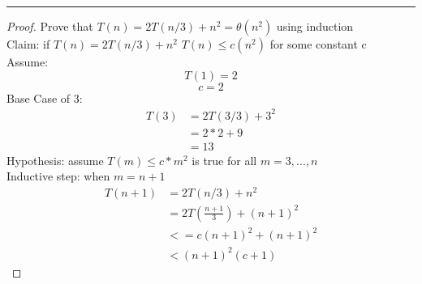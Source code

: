 \documentclass[11pt]{article}
\begin{document}
	\renewcommand{\headrulewidth}{0.4pt}
	
	
	
	\noindent
	\rule[0.1cm]{16.5cm}{0.01cm} 
	
	\vspace*{2mm}
	
	

	
	
	\bigskip
	\bigskip
	\begin{proof} Prove that $T(n) = 2T(n/3) +n^2 = \theta(n^2)$ using induction\\
	 	Claim: if $T(n) = 2T(n/3) +n^2$ $T(n) \leq c(n^2)$ for some constant c\\
	 	Assume:	\\
	 	$$T(1) = 2$$
	 	$$c = 2$$
		Base Case of 3:	
		 	\begin{align*}
		 		T(3) &= 2T(3/3) + 3^2\\
		 		&=2 * 2 + 9\\
		 		&= 13
		 	\end{align*}
		Hypothesis: assume $T(m) \leq c*m^2$ is true for all $m = 3,...,n$\\
		Inductive step: when $m = n + 1$
		\begin{align*}
			T(n+1) &= 2T(n/3) + n^2\\
			&=2T(\frac{n+1}{3}) + (n+1)^2\\
			&<= c (n+1)^2 + (n+1)^2\\
			&< (n+1)^2(c+1)
		\end{align*}
	\end{proof}
	\newpage
\end{document}
